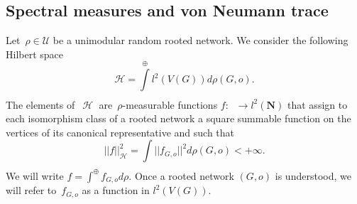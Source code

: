 \documentclass[english]{article}
\theoremstyle{definition}
\DeclareMathOperator{\Gr}{{\mathcal{G}_*}}
\DeclareMathOperator{\Hs}{{\mathcal{H}}}
\newcommand*{\field}[1]{\mathbf{#1}} %
\newcommand*\N{\field{N}} %
\newcommand*\Un{\mathcal{U}} %
\begin{document}
\subsection{Spectral measures and von Neumann trace}
Let~$\rho \in \Un$ be a unimodular random rooted network.
We consider the following Hilbert space 
$$
\mathcal{H} = \int\limits^{\oplus}_{\Gr} l^2 (V(G)) d \rho(G,o).
$$
The elements of~$\Hs$ are~$\rho$-measurable functions $f \colon \Gr \to l^2(\N)$ that assign to each isomorphism class of a rooted network a square summable function on the vertices of its canonical representative and such that 
$$
||f||^2_{\Hs} = \int\limits_{\Gr} ||f_{G,o}||^2 d \rho(G,o) < +\infty.
$$
We will write $f= \int^\oplus f_{G,o} d\rho$. Once a rooted network $(G,o)$ is understood, we will refer to~$f_{G,o}$ as a function in $l^2(V(G))$. 
\end{document}
